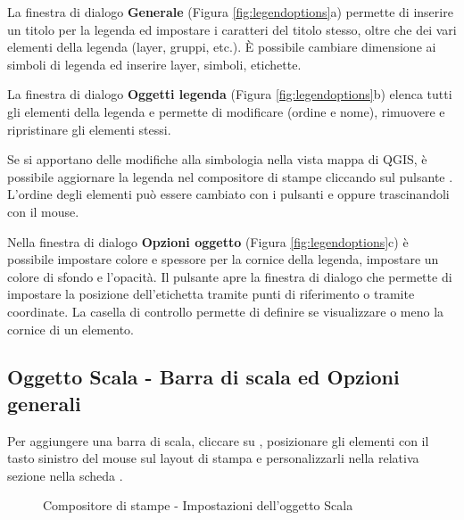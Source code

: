 
La finestra di dialogo \textbf{Generale} (Figura \ref{fig:legendoptions}a) permette di inserire un titolo per la legenda ed impostare i caratteri del titolo stesso, oltre 
che dei vari elementi della legenda (layer, gruppi, etc.). È possibile cambiare dimensione ai simboli di 
legenda ed inserire layer, simboli, etichette.


La finestra di dialogo \textbf{Oggetti legenda} (Figura \ref{fig:legendoptions}b) elenca tutti gli elementi della legenda e permette di modificare (ordine e nome), 
rimuovere e ripristinare gli elementi stessi. 

Se si apportano delle modifiche alla simbologia nella vista mappa di QGIS, è possibile aggiornare 
la legenda nel compositore di stampe cliccando sul pulsante .
L'ordine degli elementi può essere cambiato con i pulsanti  e  oppure 
trascinandoli con il mouse.


Nella finestra di dialogo \textbf{Opzioni oggetto} (Figura \ref{fig:legendoptions}c) è possibile impostare colore e spessore per la cornice della legenda, impostare 
un colore di sfondo e l'opacità. Il pulsante  apre la finestra di 
dialogo  che permette di impostare la posizione dell'etichetta 
tramite punti di riferimento o tramite coordinate.
La casella di controllo  permette di definire se visualizzare o 
meno la cornice di un elemento.

\subsection{Oggetto Scala - Barra di scala ed Opzioni generali}

Per aggiungere una barra di scala, cliccare su ,
posizionare gli elementi con il tasto sinistro del mouse sul layout di stampa e personalizzarli 
nella relativa sezione nella scheda .

\begin{figure}[ht]
\centering
{}
\hspace{1cm}
\caption{Compositore di stampe - Impostazioni dell'oggetto Scala \nixcaption}\label{fig:scalebaroptions}
\end{figure}

